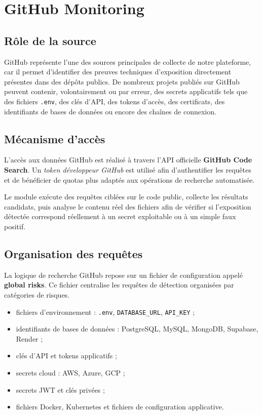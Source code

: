 \documentclass[12pt,a4paper]{report}
\begin{document}
\newpage
\section{GitHub Monitoring}

\subsection{Rôle de la source}

GitHub représente l'une des sources principales de collecte de notre plateforme, car il permet d'identifier des preuves techniques d'exposition directement présentes dans des dépôts publics. De nombreux projets publiés sur GitHub peuvent contenir, volontairement ou par erreur, des secrets applicatifs tels que des fichiers \texttt{.env}, des clés d'API, des tokens d'accès, des certificats, des identifiants de bases de données ou encore des chaînes de connexion.

\subsection{Mécanisme d'accès}

L'accès aux données GitHub est réalisé à travers l'API officielle \textbf{GitHub Code Search}. Un \textit{token développeur GitHub} est utilisé afin d'authentifier les requêtes et de bénéficier de quotas plus adaptés aux opérations de recherche automatisée.

Le module exécute des requêtes ciblées sur le code public, collecte les résultats candidats, puis analyse le contenu réel des fichiers afin de vérifier si l'exposition détectée correspond réellement à un secret exploitable ou à un simple faux positif.

\subsection{Organisation des requêtes}

La logique de recherche GitHub repose sur un fichier de configuration appelé \textbf{global risks}. Ce fichier centralise les requêtes de détection organisées par catégories de risques.

\begin{itemize}
  \item fichiers d'environnement : \texttt{.env}, \texttt{DATABASE\_URL}, \texttt{API\_KEY} ;
  \item identifiants de bases de données : PostgreSQL, MySQL, MongoDB, Supabase, Render ;
  \item clés d'API et tokens applicatifs ;
  \item secrets cloud : AWS, Azure, GCP ;
  \item secrets JWT et clés privées ;
  \item fichiers Docker, Kubernetes et fichiers de configuration applicative.
\end{itemize}
\end{document}

